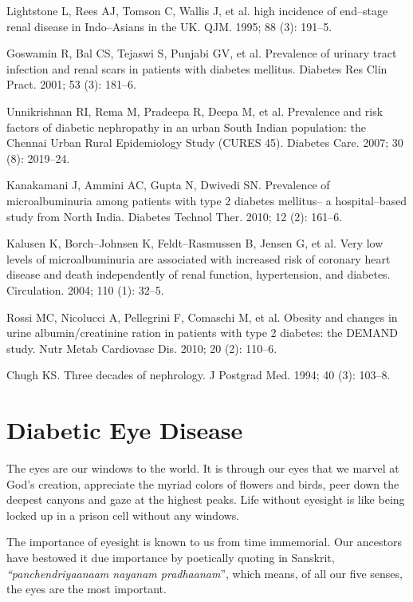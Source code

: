 {\begin{thebibliography}{99}
  Lightstone L, Rees AJ, Tomson C, Wallis J, et al. high incidence of end–stage renal disease in Indo–Asians in the UK. QJM. 1995; 88 (3): 191–5.

  Goswamin R, Bal CS, Tejaswi S, Punjabi GV, et al. Prevalence of urinary tract infection and renal scars in patients with diabetes mellitus. Diabetes Res Clin Pract. 2001; 53 (3): 181–6.

  Unnikrishnan RI, Rema M, Pradeepa R, Deepa M, et al. Prevalence and risk factors of diabetic nephropathy in an urban South Indian population: the Chennai Urban Rural Epidemiology Study (CURES 45). Diabetes Care. 2007; 30 (8): 2019–24.

  Kanakamani J, Ammini AC, Gupta N, Dwivedi SN. Prevalence of microalbuminuria among patients with type 2 diabetes mellitus– a hospital–based study from North India. Diabetes Technol Ther. 2010; 12 (2): 161–6.

  Kalusen K, Borch–Johnsen K, Feldt–Rasmussen B, Jensen G, et al. Very low levels of microalbuminuria are associated with increased risk of coronary heart disease and death independently of renal function, hypertension, and diabetes. Circulation. 2004; 110 (1): 32–5.

  Rossi MC, Nicolucci A, Pellegrini F, Comaschi M, et al. Obesity and changes in urine albumin/creatinine ration in patients with type 2 diabetes: the DEMAND study. Nutr Metab Cardiovasc Dis. 2010; 20 (2): 110–6.

  Chugh KS. Three decades of nephrology. J Postgrad Med. 1994; 40 (3): 103–8.

 \end{thebibliography}


\chapter{Diabetic Eye Disease}\label{chap15}

The eyes are our windows to the world. It is through our eyes that we marvel at God’s creation, appreciate the myriad colors of flowers and birds, peer down the deepest canyons and gaze at the highest peaks. Life without eyesight is like being locked up in a prison cell without any windows.

The importance of eyesight is known to us from time immemorial. Our ancestors have bestowed it due importance by poetically quoting in Sanskrit, \textit{“panchendriyaanaam nayanam pradhaanam}”, which means, of all our five senses, the eyes are the most important.

}
